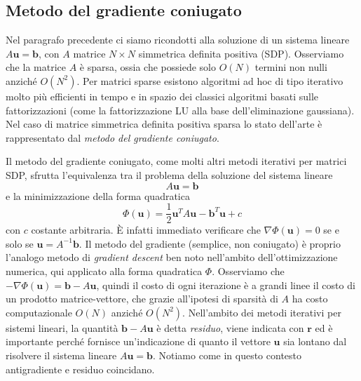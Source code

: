 \documentclass[a4paper,11pt]{article}
\renewcommand{\vec}[1]{\bm{#1}}
\newcommand{\grad}{\nabla}
\begin{document}
\subsection{Metodo del gradiente coniugato}
Nel paragrafo precedente ci siamo ricondotti alla soluzione
di un sistema lineare $A\vec{u} = \vec{b}$, con $A$ matrice
$N \times N$ simmetrica definita positiva (SDP).
Osserviamo che la matrice $A$ è sparsa, ossia che possiede
solo $O(N)$ termini non nulli anziché $O(N^2)$.
Per matrici sparse esistono algoritmi
ad hoc di tipo iterativo molto più efficienti in tempo
e in spazio dei classici algoritmi basati sulle fattorizzazioni
(come la fattorizzazione LU alla base dell'eliminazione gaussiana).
Nel caso di matrice simmetrica definita positiva sparsa
lo stato dell'arte è rappresentato dal \emph{metodo del
gradiente coniugato}.

Il metodo del gradiente coniugato, come molti altri metodi
iterativi per matrici SDP, sfrutta l'equivalenza tra il
problema della soluzione del sistema lineare
\[
A\vec{u} = \vec{b}
\]
e la minimizzazione della forma quadratica
\[
\Phi(\vec{u})
= \frac{1}{2} \vec{u}^T A \vec{u} - \vec{b}^T \vec{u} + c
\]
con $c$ costante arbitraria. È infatti immediato verificare
che $\grad \Phi(\vec{u}) = 0$ se e solo se $\vec{u} = A^{-1}\vec{b}$.
Il metodo del gradiente (semplice, non coniugato) è proprio
l'analogo metodo di \emph{gradient descent} ben noto
nell'ambito dell'ottimizzazione numerica, qui applicato alla
forma quadratica $\Phi$.
Osserviamo che $-\grad \Phi(\vec{u}) = \vec{b}-A\vec{u}$,
quindi il costo di
ogni iterazione è a grandi linee il costo di un prodotto
matrice-vettore, che grazie all'ipotesi di sparsità di $A$
ha costo computazionale $O(N)$ anziché $O(N^2)$.
Nell'ambito dei metodi iterativi per sistemi lineari,
la quantità $\vec{b}-A\vec{u}$ è detta \emph{residuo},
viene indicata con $\vec{r}$ ed è importante perché fornisce
un'indicazione di quanto il vettore $\vec{u}$ sia lontano dal
risolvere il sistema lineare $A\vec{u} = \vec{b}$.
Notiamo come in questo contesto antigradiente e residuo coincidano.
\end{document}
